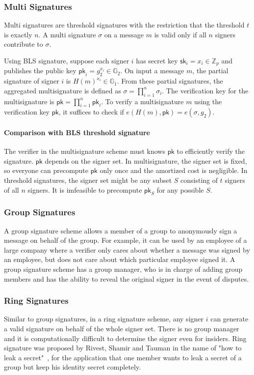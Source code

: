 \subsubsection{Multi Signatures}
Multi signatures are threshold signatures with the restriction that the threshold $t$ is exactly $n$. A multi signature $\sigma$ on a message $m$ is valid only if all $n$ signers contribute to $\sigma$. 

Using BLS signature, suppose each signer $i$ has secret key $\mathsf{sk}_i = x_i\in \mathbb{Z}_p$ and publishes the public key $\mathsf{pk}_i = g_2^{x_i}\in \mathbb{G}_2$. On input a message $m$, the partial signature of signer $i$ is $H(m)^{x_i} \in \mathbb{G}_1$. From these partial signatures, the aggregated multisignature is defined as $\sigma = \prod_{i=1}^n \sigma_i$. The verification key for the multisignature is $\mathsf{pk} = \prod_{i=1}^n \mathsf{pk}_i$. To verify a multisignature $m$ using the verification key $\mathsf{pk}$, it suffices to check if $e(H(m), \mathsf{pk}) = e(\sigma, g_2)$. 

\paragraph{Comparison with BLS threshold signature} The verifier in the multisignature scheme must knows $\mathsf{pk}$ to efficiently verify the signature. $\mathsf{pk}$ depends on the signer set. In multisignature, the signer set is fixed, so everyone can precompute $\mathsf{pk}$ only once and the amortized cost is negligible. In threshold signatures, the signer set might be any subset $S$ consisting of $t$ signers of all $n$ signers. It is imfeasible to precompute $\mathsf{pk}_S$ for any possible $S$. 

\subsubsection{Group Signatures} 
A group signature scheme allows a member of a group to anonymously sign a message on behalf of the group. For example, it can be used by an employee of a large company where a verifier only cares about whether a message was signed by an employee, but does not care about which particular employee signed it. A group signature scheme has a group manager, who is in charge of adding group members and has the ability to reveal the original signer in the event of disputes. 

\subsubsection{Ring Signatures} 
Similar to group signatures, in a ring signature scheme, any signer $i$ can generate a valid signature on behalf of the whole signer set. There is no group manager and it is computationally difficult to determine the signer even for insiders. Ring signature was proposed by Rivest, Shamir and Tauman in the name of "how to leak a secret"~\cite{DBLP:conf/asiacrypt/RivestST01}, for the application that one member wants to leak a secret of a group but keep his identity secret completely. 








